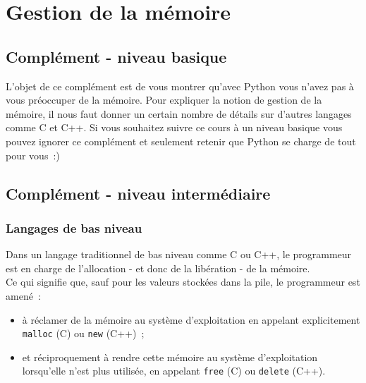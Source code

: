    \hypertarget{gestion-de-la-muxe9moire}{%
\section{Gestion de la mémoire}\label{gestion-de-la-muxe9moire}}

    \hypertarget{compluxe9ment---niveau-basique}{%
\subsection{Complément - niveau
basique}\label{compluxe9ment---niveau-basique}}

    L'objet de ce complément est de vous montrer qu'avec Python vous n'avez
pas à vous préoccuper de la mémoire. Pour expliquer la notion de gestion
de la mémoire, il nous faut donner un certain nombre de détails sur
d'autres langages comme C et C++. Si vous souhaitez suivre ce cours à un
niveau basique vous pouvez ignorer ce complément et seulement retenir
que Python se charge de tout pour vous~:)

    \hypertarget{compluxe9ment---niveau-intermuxe9diaire}{%
\subsection{Complément - niveau
intermédiaire}\label{compluxe9ment---niveau-intermuxe9diaire}}

    \hypertarget{langages-de-bas-niveau}{%
\subsubsection{Langages de bas niveau}\label{langages-de-bas-niveau}}

    Dans un langage traditionnel de bas niveau comme C ou C++, le
programmeur est en charge de l'allocation - et donc de la libération -
de la mémoire.\\

Ce qui signifie que, sauf pour les valeurs stockées dans la pile, le
programmeur est amené~:
\begin{itemize}
	\item 
	à réclamer de la mémoire au système
	d'exploitation en appelant explicitement \texttt{malloc} (C) ou
	\texttt{new} (C++)~;
	\item
	et réciproquement à rendre cette mémoire au
	système d'exploitation lorsqu'elle n'est plus utilisée, en appelant
	\texttt{free} (C) ou \texttt{delete} (C++).
\end{itemize}

